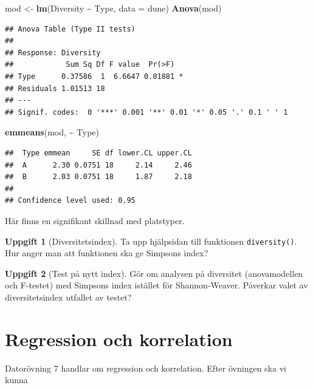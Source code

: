\documentclass[
]{book}
\newenvironment{Shaded}{\begin{snugshade}}{\end{snugshade}}
\newcommand{\AttributeTok}[1]{\textcolor[rgb]{0.13,0.29,0.53}{#1}}
\newcommand{\FunctionTok}[1]{\textcolor[rgb]{0.13,0.29,0.53}{\textbf{#1}}}
\newcommand{\NormalTok}[1]{#1}
\newcommand{\OtherTok}[1]{\textcolor[rgb]{0.56,0.35,0.01}{#1}}
\newcommand{\SpecialCharTok}[1]{\textcolor[rgb]{0.81,0.36,0.00}{\textbf{#1}}}
\theoremstyle{definition}
\theoremstyle{definition}
\theoremstyle{definition}
\newtheorem{exercise}{Uppgift}[chapter]
\theoremstyle{definition}
\theoremstyle{remark}
\begin{document}
\begin{Shaded}
\begin{Highlighting}[]
\NormalTok{mod }\OtherTok{\textless{}{-}} \FunctionTok{lm}\NormalTok{(Diversity }\SpecialCharTok{\textasciitilde{}}\NormalTok{ Type, }\AttributeTok{data =}\NormalTok{ dune)}
\FunctionTok{Anova}\NormalTok{(mod)}
\end{Highlighting}
\end{Shaded}

\begin{verbatim}
## Anova Table (Type II tests)
## 
## Response: Diversity
##            Sum Sq Df F value  Pr(>F)  
## Type      0.37586  1  6.6647 0.01881 *
## Residuals 1.01513 18                  
## ---
## Signif. codes:  0 '***' 0.001 '**' 0.01 '*' 0.05 '.' 0.1 ' ' 1
\end{verbatim}

\begin{Shaded}
\begin{Highlighting}[]
\FunctionTok{emmeans}\NormalTok{(mod, }\SpecialCharTok{\textasciitilde{}}\NormalTok{ Type)}
\end{Highlighting}
\end{Shaded}

\begin{verbatim}
##  Type emmean     SE df lower.CL upper.CL
##  A      2.30 0.0751 18     2.14     2.46
##  B      2.03 0.0751 18     1.87     2.18
## 
## Confidence level used: 0.95
\end{verbatim}

Här finns en signifikant skillnad med platstyper.

\begin{exercise}[Diversitetsindex]
Ta upp hjälpsidan till funktionen \texttt{diversity()}. Hur anger man att funktionen ska ge Simpsons index?
\end{exercise}

\begin{exercise}[Test på nytt index]
Gör om analysen på diversitet (anovamodellen och F-testet) med Simpsons index istället för Shannon-Weaver. Påverkar valet av diversitetsindex utfallet av testet?
\end{exercise}

\chapter{Regression och korrelation}\label{regression-och-korrelation}

Datorövning 7 handlar om regression och korrelation. Efter övningen ska vi kunna
\end{document}
